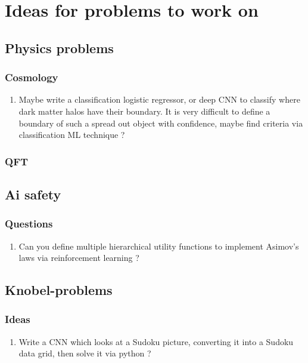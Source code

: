 

\chapter{Ideas for problems to work on}
\section{Physics problems}
\subsection{Cosmology}
\begin{enumerate}
	\item Maybe write a classification logistic regressor, or deep CNN to classify where dark matter halos have their boundary. It is very difficult to define a boundary of such a spread out object with confidence, maybe find criteria via classification ML technique ?
\end{enumerate}
\subsection{QFT}
\section{Ai safety}
\subsection{Questions}
\begin{enumerate}
	\item Can you define multiple hierarchical utility functions to implement Asimov's laws via reinforcement learning ?
\end{enumerate}
\section{Knobel-problems}
\subsection{Ideas}
\begin{enumerate}
	\item Write a CNN which looks at a Sudoku picture, converting it into a Sudoku data grid, then solve it via python ?
\end{enumerate}